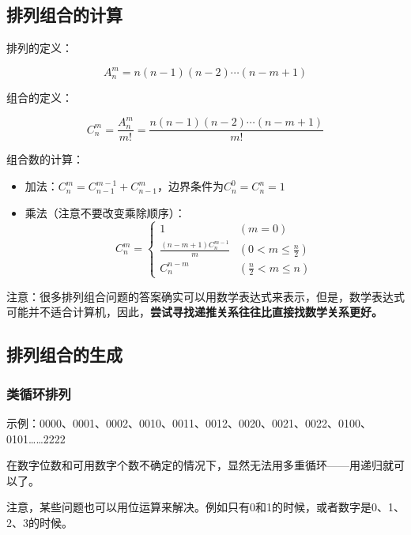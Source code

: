 \subsection{排列组合的计算}

排列的定义：

\begin{equation}
  A^m_n = n(n-1)(n-2) \cdots (n-m+1)
\end{equation}

组合的定义：

\begin{equation}
  C^m_n = \frac{A^m_n}{m!} = \frac{n(n-1)(n-2) \cdots (n-m+1)}{m!}
\end{equation}

组合数的计算：
\begin{itemize}
  \item 加法：$C^m_n=C^{m-1}_{n-1}+C^m_{n-1}$，边界条件为$C^0_n=C^n_n=1$
  \item 乘法（注意不要改变乘除顺序）：
    \begin{equation}
      C^m_n = \left \lbrace
        \begin{array}{ll}
          1	&	(m=0)	\\
          \frac{(n-m+1)C^{m-1}_n}{m} & (0<m \leq \frac{n}{2}) \\
          C^{n-m}_n & (\frac{n}{2}<m \leq n)
        \end{array}
      \right.
    \end{equation}
\end{itemize}

注意：很多排列组合问题的答案确实可以用数学表达式来表示，但是，数学表达式可能并不适合计算机，因此，\textbf{尝试寻找递推关系往往比直接找数学关系更好。}

\subsection{排列组合的生成}

\subsubsection{类循环排列}

示例：0000、0001、0002、0010、0011、0012、0020、0021、0022、0100、0101……2222

在数字位数和可用数字个数不确定的情况下，显然无法用多重循环——用递归就可以了。

注意，某些问题也可以用位运算来解决。例如只有0和1的时候，或者数字是0、1、2、3的时候。

